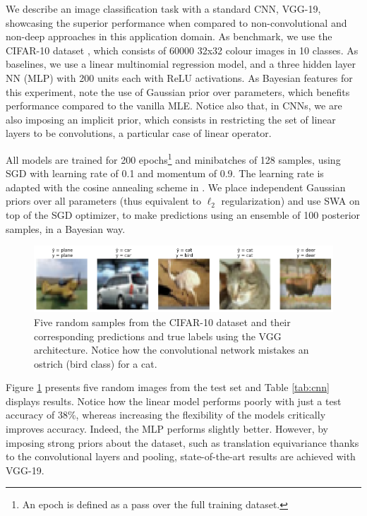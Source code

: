 We describe an image classification task with a standard CNN, VGG-19, showcasing the superior performance when compared to non-convolutional and non-deep approaches in this application domain. As benchmark, we use the CIFAR-10 dataset \parencite{krizhevsky2014cifar},
which consists of 60000 32x32 colour images in 10 classes. As baselines, we use a linear multinomial regression model, and a three hidden layer NN (MLP) with 200 units each with ReLU activations.  {As Bayesian features for this experiment, note the use of Gaussian prior over parameters, which benefits performance compared to the vanilla MLE. Notice also that, in CNNs, we are also imposing an implicit prior, which consists in restricting the set of linear layers to be convolutions, a particular case of linear operator.}

All models are trained for 200 epochs\footnote{An epoch is defined as a pass over the full training dataset.} and minibatches of 128 samples, using SGD with learning rate of 0.1 and  momentum of 0.9.
The learning rate is adapted with the cosine annealing scheme in  \cite{loshchilov2016sgdr}. We place  {independent} Gaussian priors over all parameters (thus equivalent to $\ell_2$ regularization) and use SWA on top of the SGD optimizer, to make predictions using an ensemble of   {100 posterior samples}, in a Bayesian way.

\begin{figure}[hbt]
\centering
  \includegraphics[width=1.\linewidth]{figures/cifar2.png}
  \caption{ {Five random samples from the CIFAR-10 dataset and their corresponding predictions and true labels using the VGG architecture. Notice how the convolutional network mistakes an ostrich (bird class) for a cat.}}
  \label{fig:cifar}
\end{figure}

Figure \ref{fig:cifar} presents five random images from the test set
and Table \ref{tab:cnn} displays results. Notice how the linear model performs poorly with just a test accuracy of 38\%, whereas increasing the flexibility of the models critically improves 
accuracy. Indeed, the MLP performs slightly better.
However, by imposing strong priors about the dataset, such as translation equivariance thanks to the convolutional layers and pooling, state-of-the-art results are achieved with VGG-19.

